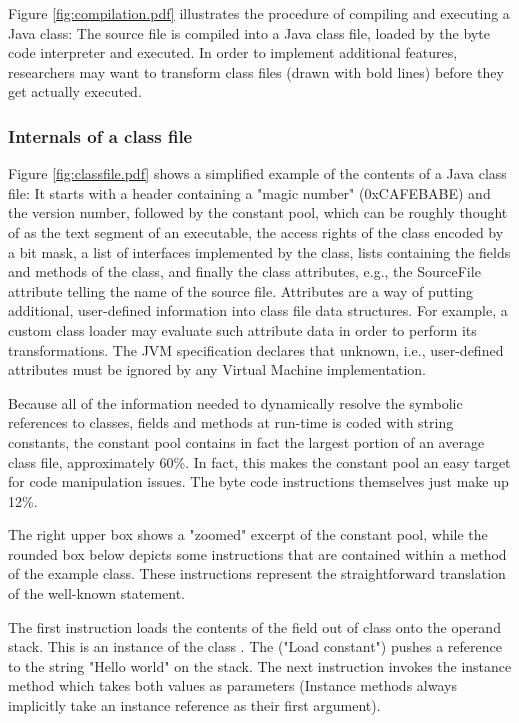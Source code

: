 Figure \autoref{fig:compilation.pdf} illustrates the procedure of compiling and
executing a Java class: The source file is compiled into a Java class file,
loaded by the byte code interpreter and executed. In order to implement
additional features, researchers may want to transform class files (drawn with
bold lines) before they get actually executed.

\subsubsection{Internals of a class file}

Figure \autoref{fig:classfile.pdf} shows a simplified example of the contents of a
Java class file: It starts with a header containing a "magic number"
(0xCAFEBABE) and the version number, followed by the constant pool, which can be
roughly thought of as the text segment of an executable, the access rights of
the class encoded by a bit mask, a list of interfaces implemented by the class,
lists containing the fields and methods of the class, and finally the class
attributes, e.g., the SourceFile attribute telling the name of the source file.
Attributes are a way of putting additional, user-defined information into class
file data structures. For example, a custom class loader may evaluate such
attribute data in order to perform its transformations. The JVM specification
declares that unknown, i.e., user-defined attributes must be ignored by any
Virtual Machine implementation.

Because all of the information needed to dynamically resolve the symbolic
references to classes, fields and methods at run-time is coded with string
constants, the constant pool contains in fact the largest portion of an average
class file, approximately 60\%. In fact, this makes the constant pool an easy
target for code manipulation issues. The byte code instructions themselves just
make up 12\%. 

The right upper box shows a "zoomed" excerpt of the constant pool, while the
rounded box below depicts some instructions that are contained within a method
of the example class. These instructions represent the straightforward
translation of the well-known  statement.

The first instruction loads the contents of the field out of class
 onto the operand stack. This is an instance of the class
. The  ("Load constant") pushes a reference
to the string "Hello world" on the stack. The next instruction invokes the
instance method  which takes both values as parameters (Instance
methods always implicitly take an instance reference as their first argument).

